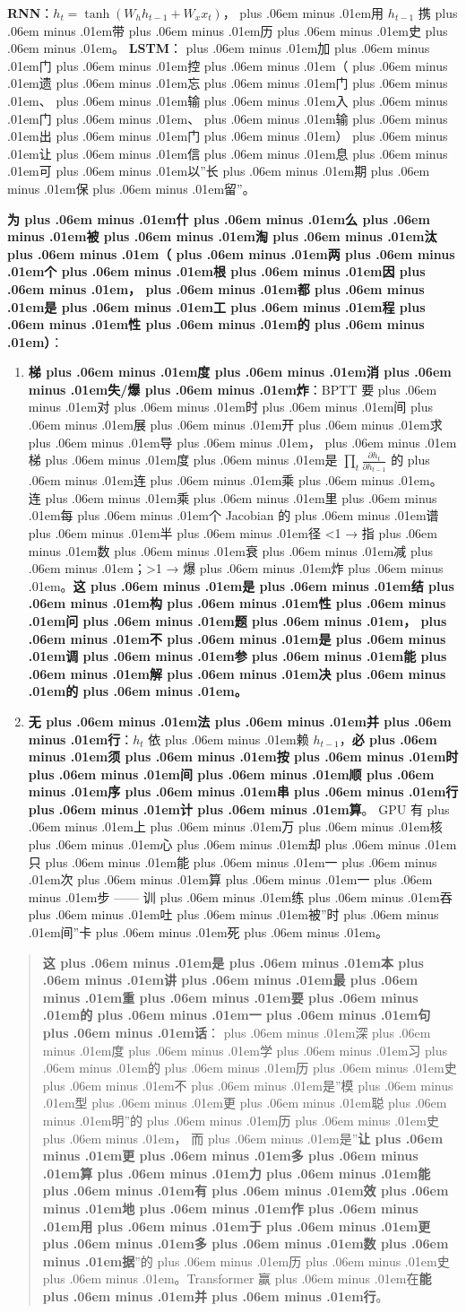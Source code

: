 \documentclass[
]{article}
\providecommand{\tightlist}{%
  \setlength{\itemsep}{0pt}\setlength{\parskip}{0pt}}
\def\zh#1{{\zhfont #1}}
\def\sym#1{{\symfont #1}}
\def\zhglue{\hskip0pt plus .06em minus .01em}
\begin{document}
\textbf{RNN}\zh{：}\(h_t = \tanh(W_h h_{t-1} + W_x x_t)\)\zh{，\zhglue 用} \(h_{t-1}\) \zh{携\zhglue 带\zhglue 历\zhglue 史\zhglue 。} \textbf{LSTM}\zh{：\zhglue 加\zhglue 门\zhglue 控\zhglue （\zhglue 遗\zhglue 忘\zhglue 门\zhglue 、\zhglue 输\zhglue 入\zhglue 门\zhglue 、\zhglue 输\zhglue 出\zhglue 门\zhglue ）\zhglue 让\zhglue 信\zhglue 息\zhglue 可\zhglue 以}''\zh{长\zhglue 期\zhglue 保\zhglue 留}''\zh{。}

\textbf{\zh{为\zhglue 什\zhglue 么\zhglue 被\zhglue 淘\zhglue 汰\zhglue （\zhglue 两\zhglue 个\zhglue 根\zhglue 因\zhglue ，\zhglue 都\zhglue 是\zhglue 工\zhglue 程\zhglue 性\zhglue 的\zhglue ）}}\zh{：}

\begin{enumerate}
\def\labelenumi{\arabic{enumi}.}
\tightlist
\item
  \textbf{\zh{梯\zhglue 度\zhglue 消\zhglue 失}/\zh{爆\zhglue 炸}}\zh{：}BPTT \zh{要\zhglue 对\zhglue 时\zhglue 间\zhglue 展\zhglue 开\zhglue 求\zhglue 导\zhglue ，\zhglue 梯\zhglue 度\zhglue 是} \(\prod_t \frac{\partial h_t}{\partial h_{t-1}}\) \zh{的\zhglue 连\zhglue 乘\zhglue 。} \zh{连\zhglue 乘\zhglue 里\zhglue 每\zhglue 个} Jacobian \zh{的\zhglue 谱\zhglue 半\zhglue 径} \textless1 \sym{→} \zh{指\zhglue 数\zhglue 衰\zhglue 减\zhglue ；}\textgreater1 \sym{→} \zh{爆\zhglue 炸\zhglue 。}\textbf{\zh{这\zhglue 是\zhglue 结\zhglue 构\zhglue 性\zhglue 问\zhglue 题\zhglue ，\zhglue 不\zhglue 是\zhglue 调\zhglue 参\zhglue 能\zhglue 解\zhglue 决\zhglue 的\zhglue 。}}
\item
  \textbf{\zh{无\zhglue 法\zhglue 并\zhglue 行}}\zh{：}\(h_t\) \zh{依\zhglue 赖} \(h_{t-1}\)\zh{，}\textbf{\zh{必\zhglue 须\zhglue 按\zhglue 时\zhglue 间\zhglue 顺\zhglue 序\zhglue 串\zhglue 行\zhglue 计\zhglue 算}}\zh{。} GPU \zh{有\zhglue 上\zhglue 万\zhglue 核\zhglue 心\zhglue 却\zhglue 只\zhglue 能\zhglue 一\zhglue 次\zhglue 算\zhglue 一\zhglue 步} ------ \zh{训\zhglue 练\zhglue 吞\zhglue 吐\zhglue 被}''\zh{时\zhglue 间}''\zh{卡\zhglue 死\zhglue 。}
\end{enumerate}

\begin{quote}
\textbf{\zh{这\zhglue 是\zhglue 本\zhglue 讲\zhglue 最\zhglue 重\zhglue 要\zhglue 的\zhglue 一\zhglue 句\zhglue 话}}\zh{：\zhglue 深\zhglue 度\zhglue 学\zhglue 习\zhglue 的\zhglue 历\zhglue 史\zhglue 不\zhglue 是}''\zh{模\zhglue 型\zhglue 更\zhglue 聪\zhglue 明}''\zh{的\zhglue 历\zhglue 史\zhglue ，} \zh{而\zhglue 是}''\textbf{\zh{让\zhglue 更\zhglue 多\zhglue 算\zhglue 力\zhglue 能\zhglue 有\zhglue 效\zhglue 地\zhglue 作\zhglue 用\zhglue 于\zhglue 更\zhglue 多\zhglue 数\zhglue 据}}''\zh{的\zhglue 历\zhglue 史\zhglue 。}Transformer \zh{赢\zhglue 在}\textbf{\zh{能\zhglue 并\zhglue 行}}\zh{。}
\end{quote}
\end{document}
